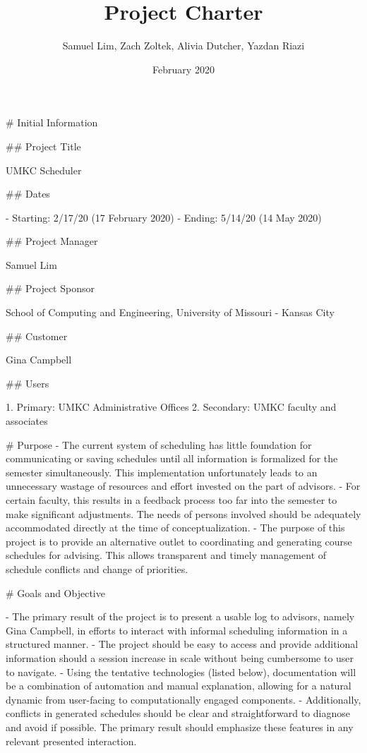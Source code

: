 \documentclass{article}
\title{Project Charter}
\author{Samuel Lim, Zach Zoltek, Alivia Dutcher, Yazdan Riazi}
\date{February 2020}
\begin{document}
\maketitle
\tableofcontents

\begin{markdown}

# Initial Information

## Project Title

UMKC Scheduler

## Dates

- Starting: 2/17/20 (17 February 2020)
- Ending: 5/14/20 (14 May 2020)

## Project Manager

Samuel Lim

## Project Sponsor

School of Computing and Engineering, University of Missouri - Kansas City

## Customer

Gina Campbell

## Users

1. Primary: UMKC Administrative Offices
2. Secondary: UMKC faculty and associates

# Purpose
- The current system of scheduling has little foundation for communicating or saving schedules until all information is formalized for the semester simultaneously. This implementation unfortunately leads to an unnecessary wastage of resources and effort invested on the part of advisors.  
- For certain faculty, this results in a feedback process too far into the semester to make significant adjustments. The needs of persons involved should be adequately accommodated directly at the time of conceptualization.
- The purpose of this project is to provide an alternative outlet to coordinating and generating course schedules for advising. This allows transparent and timely management of schedule conflicts and change of priorities.

# Goals and Objective

- The primary result of the project is to present a usable log to advisors, namely Gina Campbell, in efforts to interact with informal scheduling information in a structured manner.
- The project should be easy to access and provide additional information should a session increase in scale without being cumbersome to user to navigate.
- Using the tentative technologies (listed below), documentation will be a combination of automation and manual explanation, allowing for a natural dynamic from user-facing to computationally engaged components.
- Additionally, conflicts in generated schedules should be clear and straightforward to diagnose and avoid if possible. The primary result should emphasize these features in any relevant presented interaction.


\end{markdown}
\end{document}
